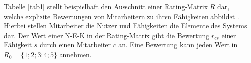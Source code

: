 

Tabelle \ref{tab1} stellt beispielhaft den Ausschnitt einer Rating-Matrix $R$ dar, welche explizite Bewertungen von Mitarbeitern zu ihren Fähigkeiten abbildet \cite[S. 735]{adomavicius:inproceedings}\cite[S. 16]{link:booklet}.
Hierbei stellen Mitarbeiter die Nutzer und Fähigkeiten die Elemente des Systems dar.
Der Wert einer \ac{N-E-K} in der Rating-Matrix gibt die Bewertung $r_{cs}$ einer Fähigkeit $s$ durch einen Mitarbeiter $c$ an.
Eine Bewertung kann jeden Wert in $R_{0}=\{1;2;3;4;5\}$ annehmen.

